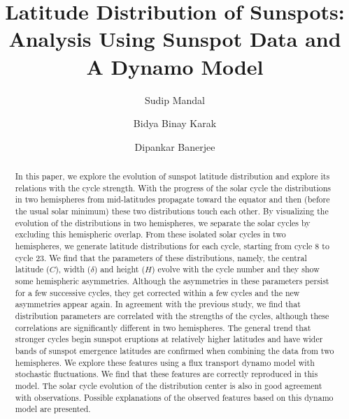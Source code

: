 \documentclass[preprint2,times,tighten]{aastex61}
\begin{document}

\title{Latitude Distribution of Sunspots: Analysis Using Sunspot Data and A Dynamo Model}


\author[0000-0002-7762-5629]{Sudip Mandal}

\author{Bidya Binay Karak}

\author{Dipankar Banerjee}



\begin{abstract}
In this paper, we explore the evolution of sunspot latitude distribution and explore its relations with the cycle strength.  
With the progress of the solar cycle the distributions in two hemispheres from mid-latitudes propagate toward the equator
and then (before the usual solar minimum) these two distributions touch each other. 
By visualizing the evolution of the distributions 
in two hemispheres, we separate the solar cycles by excluding this hemispheric overlap. From these
isolated solar cycles in two hemispheres, we generate latitude distributions for each cycle, starting from cycle 8 to cycle 23.
We find that the parameters of these distributions, namely, the central latitude ($C$), width ($\delta$) and height ($H$)
evolve with the cycle number and they show some hemispheric asymmetries.
Although the asymmetries in these parameters persist for a few successive cycles, they get corrected within a few cycles and the new asymmetries appear again.
In agreement with the previous study, we find that distribution parameters are correlated with the strengths of the cycles,
although these correlations are significantly different in two hemispheres. The general trend
that stronger cycles begin sunspot eruptions at relatively higher latitudes and have wider bands of sunspot emergence latitudes are confirmed
when combining the data from two hemispheres.
We explore these features using a flux transport dynamo model with stochastic fluctuations.
We find that these features are correctly reproduced in this model.
The solar cycle evolution of the distribution center is also in good agreement with observations.
Possible explanations of the observed features based on this dynamo model are presented.
\end{abstract}
\end{document}
